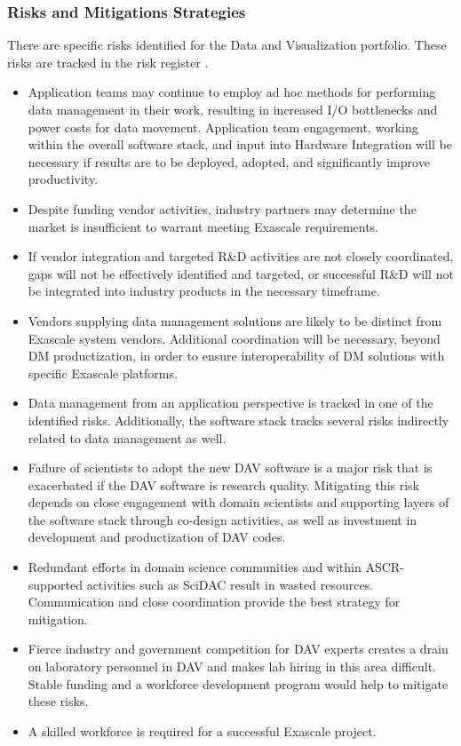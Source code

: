 \subsubsection{Risks and Mitigations Strategies}
There are specific risks identified for the Data and Visualization portfolio.  These risks are tracked in the risk register .  
\begin{itemize}
\item Application teams may continue to employ ad hoc methods for performing data management in their work, resulting in increased I/O bottlenecks and power costs for data movement. Application team engagement, working within the overall software stack, and input into Hardware Integration will be necessary if results are to be deployed, adopted, and significantly improve productivity.
\item Despite funding vendor activities, industry partners may determine the market is insufficient to warrant meeting Exascale requirements.
\item If vendor integration and targeted R\&D activities are not closely coordinated, gaps will not be effectively identified and targeted, or successful R\&D will not be integrated into industry products in the necessary timeframe.
\item Vendors supplying data management solutions are likely to be distinct from Exascale system vendors. Additional coordination will be necessary, beyond DM productization, in order to ensure interoperability of DM solutions with specific Exascale platforms.
\item Data management from an application perspective is tracked in one of the identified risks.  Additionally, the software stack tracks several risks indirectly related to data management as well.
\item Failure of scientists to adopt the new DAV software is a major risk that is exacerbated if the DAV software is research quality. Mitigating this risk depends on close engagement with domain scientists and supporting layers of the software stack through co-design activities, as well as investment in development and productization of DAV codes.
\item Redundant efforts in domain science communities and within ASCR-supported activities such as SciDAC result in wasted resources. Communication and close coordination provide the best strategy for mitigation.
\item Fierce industry and government competition for DAV experts creates a drain on laboratory personnel in DAV and makes lab hiring in this area difficult. Stable funding and a workforce development program would help to mitigate these risks.
\item A skilled workforce is required for a successful Exascale project.
\end{itemize}


